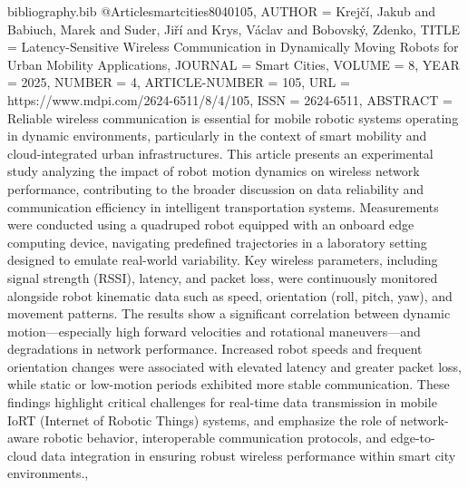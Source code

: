 \documentclass[fleqn,10pt]{wlscirep}
\begin{document}
\begin{filecontents}{bibliography.bib}
@Article{smartcities8040105,
AUTHOR = {Krejčí, Jakub and Babiuch, Marek and Suder, Jiří and Krys, Václav and Bobovský, Zdenko},
TITLE = {Latency-Sensitive Wireless Communication in Dynamically Moving Robots for Urban Mobility Applications},
JOURNAL = {Smart Cities},
VOLUME = {8},
YEAR = {2025},
NUMBER = {4},
ARTICLE-NUMBER = {105},
URL = {https://www.mdpi.com/2624-6511/8/4/105},
ISSN = {2624-6511},
ABSTRACT = {Reliable wireless communication is essential for mobile robotic systems operating in dynamic environments, particularly in the context of smart mobility and cloud-integrated urban infrastructures. This article presents an experimental study analyzing the impact of robot motion dynamics on wireless network performance, contributing to the broader discussion on data reliability and communication efficiency in intelligent transportation systems. Measurements were conducted using a quadruped robot equipped with an onboard edge computing device, navigating predefined trajectories in a laboratory setting designed to emulate real-world variability. Key wireless parameters, including signal strength (RSSI), latency, and packet loss, were continuously monitored alongside robot kinematic data such as speed, orientation (roll, pitch, yaw), and movement patterns. The results show a significant correlation between dynamic motion—especially high forward velocities and rotational maneuvers—and degradations in network performance. Increased robot speeds and frequent orientation changes were associated with elevated latency and greater packet loss, while static or low-motion periods exhibited more stable communication. These findings highlight critical challenges for real-time data transmission in mobile IoRT (Internet of Robotic Things) systems, and emphasize the role of network-aware robotic behavior, interoperable communication protocols, and edge-to-cloud data integration in ensuring robust wireless performance within smart city environments.},
}


\end{filecontents}
\end{document}
